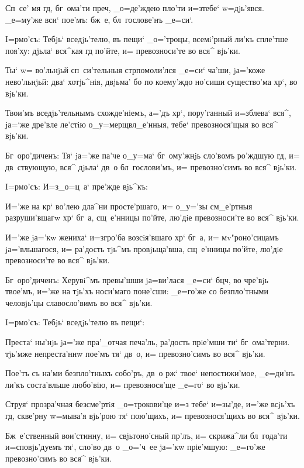 Сп~се' мя гд, бг~ома'ти преч, _о=де'ждею 
пло'ти и=з\ъ тебе` w=дjь'явся. _е=му'же вси` пое'мъ: 
бж~е, бл~гослове'нъ _е=си`.


I=рмо'съ: Тебjь` вседjь'телю, въ пещи` _о='троцы, 
всемi'рный ли'къ спле'тше поя'ху: дjьла` вся^кая гд 
по'йте, и= превозноси'те во вся^ вjь'ки.

Ты` w= во'льнjьй сп~си'тельныя стр помоли'лся 
_е=си` ча'ши, jа='коже нево'льнjьй: два` хотjь^нiя, 
двjьма' бо по коему'ждо но'сиши существо'ма хр`, во 
вjь'ки.

Твои'мъ вседjь'тельнымъ схожде'нiемъ, а='дъ хр`, 
пору'ганный и=зблева` вся^, jа=`же дре'вле ле'стiю 
о_у=мерщвл_е'нныя, тебе` превознося'щыя во вся^ вjь'ки.

Бг~оро'диченъ: Тя` jа='же па'че о_у=ма` бг~ому'жнjь 
сло'вомъ ро'ждшую гд, и= дв~ствующую, вся^ дjьла` дв~о 
бл~гослови'мъ, и= превозно'симъ во вся^ вjь'ки. 

 I=рмо'съ: И=з\ъ _о=ц~а` пре'жде вjь^къ:

И='же на кр` во'лею дла^ни просте'ршаго, и= 
о_у='зы см_е'ртныя разруши'вшагw хр` бг~а, сщ~е'нницы 
по'йте, лю'дiе превозноси'те во вся^ вjь'ки. 

И='же jа='кw жениха` и=з\ъ гро'ба возсiя'вшаго хр` 
бг~а, и= мv"роно'сицамъ jа='вльшагося, и= ра'дость тjь^мъ 
провjьща'вша, сщ~е'нницы по'йте, лю'дiе превозноси'те во 
вся^ вjь'ки.

Бг~оро'диченъ: Херувi^мъ превы'шши jа=ви'лася _е=си` 
бц ч, во чре'вjь твое'мъ, и='же на тjь'хъ 
носи'маго поне'сши: _е=го'же со безпло'тными человjь'цы 
славосло'вимъ во вся^ вjь'ки. 

 I=рмо'съ: Тебjь` вседjь'телю въ пещи`:

Преста` ны'нjь jа='же пра'_отчая печа'ль, ра'дость 
прiе'мши ти` бг~ома'терни. тjь'мже непреста'ннw пое'мъ 
тя` дв~о, и= превозно'симъ во вся^ вjь'ки.

Пое'тъ съ на'ми безпло'тныхъ собо'ръ, дв~о рж` 
твое` непостижи'мое, _е=ди'нъ ли'къ соста'вльше любо'вiю, 
и= превознося'ще _е=го` во вjь'ки.

Струя` прозра'чная безсме'ртiя _о=трокови'це и=з\ъ 
тебе` и=зы'де, и='же всjь'хъ гд, скве'рну w=мыва'я 
вjь'рою тя` пою'щихъ, и= превознося'щихъ во вся^ вjь'ки.

Бж~е'ственный вои'стинну, и= свjьтоно'сный пр'лъ, 
и= скрижа^ли бл~года'ти и=сповjь'дуемъ тя`, сло'во дв~о 
_о='ч~ее jа='кw прiе'мшую: _е=го'же превозно'симъ во вся^ 
вjь'ки.

